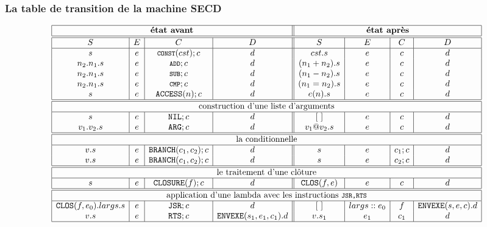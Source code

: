 \subsubsection{La table de transition de la machine SECD}
\begin{footnotesize}
\[
\begin{array}{|c|c|c|c || c|c|c|c|}
  \hline
  \multicolumn{4}{|c||}{\textbf{état avant}} & \multicolumn{4}{c|}{\textbf{état après}} \\
  \hline \hline
  S & E & C & D & S & E & C & D \\
  \hline
  
  s         & e & \texttt{CONST}(cst); c & d                & cst.s         & e & c &  d \\
  n_2.n_1.s & e & \texttt{ADD}; c        & d                & (n_1 + n_2).s & e & c &  d \\
  n_2.n_1.s & e & \texttt{SUB}; c        & d                & (n_1 - n_2).s & e & c &  d \\
  n_2.n_1.s & e & \texttt{CMP}; c        & d                & (n_1 = n_2).s & e & c &  d \\
        s   & e & \mathtt{ACCESS}(n);c   & d                & e(n).s        & e & c &  d \\ 
  \hline \hline
  \multicolumn{8}{|c|}{\textrm{construction d'une liste d'arguments}} \\
  \hline
  s         & e & \mathtt{NIL}; c        & d                & [\ ]   & e & c &  d \\
  v_1.v_2.s & e & \mathtt{ARG}; c        & d                & v_1 @ v_2 . s & e & c &  d \\
  \hline \hline
  \multicolumn{8}{|c|}{\textrm{la conditionnelle}} \\
  \hline
  v.s       & e & \mathtt{BRANCH}(c_1, c_2);c & d             & s             & e & c_1;c & d \\
  v.s       & e & \mathtt{BRANCH}(c_1, c_2);c & d             & s             & e & c_2;c & d \\
  \hline \hline
  \multicolumn{8}{|c|}{\textrm{le traitement d'une clôture}} \\
  \hline
  s         & e &  \mathtt{CLOSURE}(f);c      & d             & \mathtt{CLOS}(f,e) & e & c & d \\
  \hline \hline 
  \multicolumn{8}{|c|}{\textrm{application d'une lambda avec les instructions }\texttt{JSR,RTS}} \\
  \hline 
  \mathtt{CLOS}(f,e_0).largs.s & e & \mathtt{JSR};c & d       & [\ ] & largs::e_0 & f & \mathtt{ENVEXE}(s,e,c).d \\
  v.s & e & \mathtt{RTS};c & \mathtt{ENVEXE}(s_1, e_1, c_1).d & v.s_1 & e_1 & c_1 & d \\     
  \hline
\end{array}
\]

\end{footnotesize}

